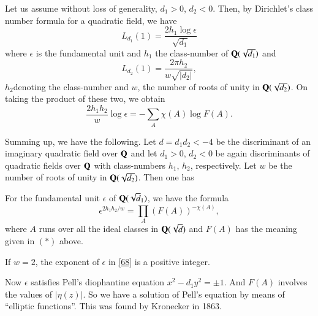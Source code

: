 Let us assume without loss of generality, $d_{1}>0$, $d_{2}<0$. Then,
by Dirichlet's class number formula for a quadratic field, we have
$$
L_{d_{1}}(1)=\frac{2h_{1}\log\epsilon}{\sqrt{d_{1}}}
$$
where $\epsilon$ is the fundamental unit and $h_{1}$ the class-number
of $\mathbf{Q}(\sqrt{d_{1}})$ and 
$$
L_{d_{2}}(1)=\frac{2\pi h_{2}}{w\sqrt{|d_{2}|}}, 
$$
$h_{2}$\pageoriginale denoting the class-number and $w$, the number of
roots of unity in $\mathbf{Q}(\sqrt{d_{2}})$. On taking the product of these
two, we obtain
$$
\frac{2h_{1}h_{2}}{w}\log \epsilon=-\sum_{A}\chi(A)\log F(A).
$$

Summing up, we have the following. Let $d=d_{1}d_{2}<-4$ be the
discriminant of an imaginary quadratic field over $\mathbf{Q}$ and let
$d_{1}>0$, $d_{2}<0$ be again discriminants of quadratic fields over
$\mathbf{Q}$ with class-numbers $h_{1}$, $h_{2}$, respectively. Let $w$ be
the number of roots of unity in $\mathbf{Q}(\sqrt{d_{2}})$. Then one has

\begin{thm}\label{thm6}
For the fundamental unit $\epsilon$ of $\mathbf{Q}(\sqrt{d}_{1})$, we have
the formula
\begin{equation*}
\epsilon^{2h_{1}h_{2}/w}=\prod_{A}(F(A))^{-\chi(A)},\tag{68}\label{68} 
\end{equation*}
where $A$ runs over all the ideal classes in $\mathbf{Q}(\sqrt{d})$ and
$F(A)$ has the meaning given in $(\ast)$ above.
\end{thm}

If $w=2$, the exponent of $\epsilon$ in \eqref{68} is a positive
integer.

Now $\epsilon$ satisfies Pell's diophantine equation
$x^{2}-d_{1}y^{2}=\pm 1$. And $F(A)$ involves the values of
$|\eta(z)|$. So we have a solution of Pell's equation by means of
``elliptic functions''. This was found by Kronecker in 1863.

